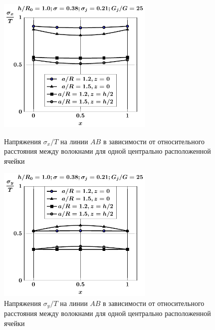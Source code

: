 \begin{figure}[h!]
\centering\footnotesize
\parbox[b]{7.5cm}{\centering\includegraphics[width=7.5cm]{inc7-a-sig_x.pdf}
\caption{Напряжения $\sigma_x/T$ на линии $AB$ в зависимости от относительного расстояния между волокнами для одной центрально расположенной ячейки
\label{f:7:80}}}\hfil\hfil
\parbox[b]{7.5cm}{\centering\includegraphics[width=7.5cm]{inc7-a-sig_y.pdf}
\caption{Напряжения $\sigma_y/T$ на линии $AB$ в зависимости от относительного расстояния между волокнами для одной центрально расположенной ячейки
\label{f:7:81}}}
\end{figure}

%

